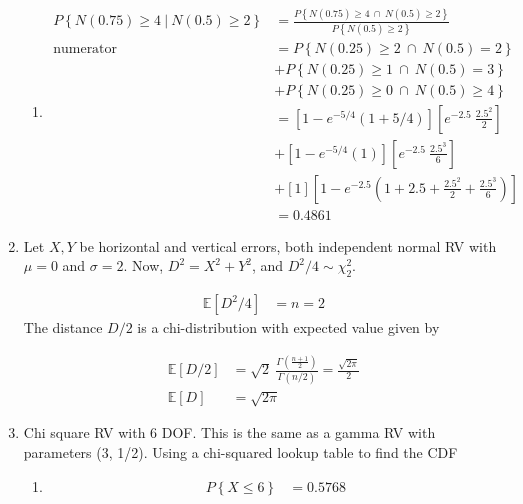 \begin{enumerate}
\begin{enumerate}
			\item
			\begin{align}
				P \left\{N(0.75) \geq 4\ |\ N(0.5) \geq 2\right\} &= \frac{P \left\{N(0.75) \geq 4\ \cap\ N(0.5) \geq 2\right\}}{P \left\{N(0.5) \geq 2\right\}} \nonumber \\
				\text{numerator}&= P \left\{N(0.25) \geq 2\ \cap\ N(0.5) = 2\right\} \nonumber \\
				&+ P \left\{N(0.25) \geq 1\ \cap\ N(0.5) = 3\right\} \nonumber \\ 
				&+ P\left\{N(0.25) \geq 0\ \cap\ N(0.5) \geq 4\right\} \\
				&= \left[1 - e^{-5/4}(1 + 5/4)\right] \left[e^{-2.5}\ \frac{2.5^2}{2}\right]  \nonumber \\
				&+ \left[1 - e^{-5/4}(1)\right] \left[e^{-2.5}\ \frac{2.5^3}{6}\right] \nonumber \\
				&+ \left[1\right] \left[1 - e^{-2.5}\left(1 + 2.5 + \frac{2.5^2}{2} + \frac{2.5^3}{6}\right)\right] \\
				&= 0.4861
			\end{align}
			
		\end{enumerate}
	
	
	\item Let $ X, Y $ be horizontal and vertical errors, both independent normal RV with  $ \mu = 0 $ and $ \sigma = 2 $. Now, $ D^2 = X^2 + Y^2 $, and  $D^2 / 4 \sim \chi_2^2 $.
			
		\begin{align}
			\mathbb{E}[D^2 / 4] &= n = 2 \nonumber
		\end{align}
		The distance $ D/2 $ is a chi-distribution with expected value given by
		
		\begin{align}
			\mathbb{E}[D/2] &= \sqrt{2} \ \frac{\Gamma\left(\frac{n+1}{2}\right)}{\Gamma(n/2)} = \frac{\sqrt{2 \pi}}{2} \nonumber \\
			\mathbb{E}[D] &= \sqrt{2 \pi}
		\end{align}
	
	
	\item Chi square RV with 6 DOF. This is the same as a gamma RV with parameters (3, 1/2).  Using a chi-squared lookup table to find the CDF\\
			
		\begin{enumerate}
			\item
			\begin{align}
				P \left\{X \leq 6\right\} &= 0.5768
			\end{align}
			

\end{enumerate}
\end{enumerate}
